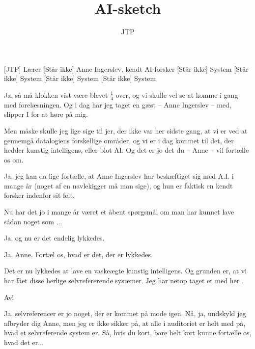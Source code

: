 \documentclass[a4paper,11pt]{article}
\title{AI-sketch}
\author{JTP}
\begin{document}
\maketitle

\begin{roles}
[JTP] Lærer
[Står ikke] Anne Ingerslev, kendt AI-forsker
[Står ikke] System
[Står ikke] System
[Står ikke] System
[Står ikke] System

\end{roles}


\begin{sketch}


 Ja, så må klokken vist være blevet $\frac{1}{4}$ over, og vi skulle vel
se at komme i gang med forelæsningen. Og i dag har jeg taget en gæst -- Anne
Ingerslev -- med, slipper I for at høre på mig.

Men måske skulle jeg lige sige til jer, der ikke var her sidste gang, at vi er
ved at gennemgå datalogiens forskellige områder, og vi er i dag kommet til det,
der hedder kunstig intelligens, eller blot AI. Og det er jo det du -- Anne --
vil fortælle os om.

Ja, jeg kan da lige fortælle, at Anne Ingerslev har beskæftiget sig med A.I. i
mange år (noget af en navlekigger må man sige), og hun er faktisk en kendt
forsker indenfor sit felt.

Nu har det jo i mange år været et åbent spørgsmål om  man har
kunnet lave sådan noget som ...

 Ja, og nu er det endelig lykkedes.

 Ja, Anne. Fortæl os, hvad er det, der er lykkedes.

 Det er nu lykkedes at lave en vaskeægte kunstig intelligens. Og
grunden er, at vi har fået disse herlige selvrefererende systemer. Jeg har netop
taget et med her .

 Av!

 Ja, selvreferencer er jo noget, der er kommet på mode igen. Nå, ja,
undskyld jeg afbryder dig Anne, men jeg er ikke sikker på, at alle i auditoriet
er helt med på, hvad et selvreferende system er. Så, hvis du kort, bare helt
kort kunne fortælle os, hvad det er...


\end{sketch}
\end{document}
